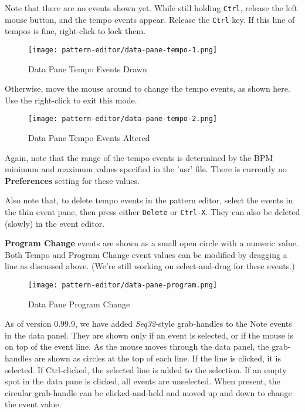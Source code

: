 \begin{itemize}
   Note that there are no events shown yet.
   While still holding \texttt{Ctrl}, release the left mouse button,
   and the tempo events appear.
   Release the \texttt{Ctrl} key.
   If this line of tempos is fine, right-click to lock them.

\begin{figure}[H]
   \centering 
   \texttt{[image: pattern-editor/data-pane-tempo-1.png]}
   \caption{Data Pane Tempo Events Drawn}
   \label{fig:pattern_editor_data_pane_tempo_events_drawn}
\end{figure}

   Otherwise, move the mouse around to change
   the tempo events, as shown here.
   Use the right-click to exit this mode.

\begin{figure}[H]
   \centering 
   \texttt{[image: pattern-editor/data-pane-tempo-2.png]}
   \caption{Data Pane Tempo Events Altered}
   \label{fig:pattern_editor_data_pane_tempo_events_altered}
\end{figure}

   Again, note that the range of the tempo events is
   determined by the BPM minimum and maximum values
   specified in the 'usr' file.
   There is currently no \textbf{Preferences}
   setting for these values.  

   Also note that, to delete tempo events in the pattern editor,
   select the events in the thin event pane, then press
   either \texttt{Delete} or \texttt{Ctrl-X}.
   They can also be deleted (slowly) in the event editor.

   \textbf{Program Change}
   events are shown as a small open circle with a numeric value.
   Both Tempo and Program Change event values can be modified by dragging a
   line as discussed above. (We're still working on select-and-drag for
   these events.)

\begin{figure}[H]
   \centering 
   \texttt{[image: pattern-editor/data-pane-program.png]}
   \caption{Data Pane Program Change}
   \label{fig:pattern_editor_data_pane_program_change}
\end{figure}

   As of version 0.99.9, we have added \textsl{Seq32}-style grab-handles
   to the Note events in the data panel.
   They are shown only if an event is selected, or if the mouse
   is on top of the event line.
   As the mouse moves through the data panel, the grab-handles are shown
   as circles at the top of each line.
   If the line is clicked, it is selected.
   If Ctrl-clicked, the selected line is added to the selection.
   If an empty spot in the data pane is clicked, all events are
   unselected.
   When present, the circular grab-handle can be clicked-and-held
   and moved up and down to change the event value.


\end{itemize}
